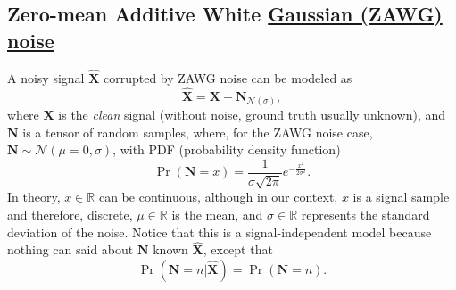 \documentclass{article}
\begin{document}

\subsection{Zero-mean Additive White \href{https://en.wikipedia.org/wiki/Gaussian_noise}{Gaussian (ZAWG) noise}}

A noisy signal $\hat{\mathbf X}$ corrupted by ZAWG noise can be modeled as
\begin{equation}
  \hat{\mathbf X} = {\mathbf X} + {\mathbf N}_{{\mathcal N}(\sigma)},
  \label{eq:AWG_noise_model}  
\end{equation}
where $\mathbf{X}$ is the \emph{clean} signal (without noise, ground
truth usually unknown),
and ${\mathbf N}$ is a tensor of random samples,
where, for the ZAWG noise case,
${\mathbf N}\sim{\mathcal N}(\mu=0,\sigma)$, with PDF (probability density
function)
\begin{equation}
  \Pr({\mathbf N}{=}x) = \frac 1 {\sigma\sqrt{2\pi}} e^{-\frac{x^2}{2\sigma^2} }.
\end{equation}
In theory, $x\in\mathbb{R}$ can be continuous, although in our
context, $x$ is a signal sample and therefore, discrete,
$\mu\in\mathbb{R}$ is the mean, and $\sigma\in\mathbb{R}$ represents
the standard deviation of the noise. Notice that this is a
signal-independent model because nothing can said about ${\mathbf N}$
known $\hat{\mathbf X}$, except that
\begin{equation}
  \Pr(\mathbf{N}{=}n|\hat{\mathbf{X}}) = \Pr(\mathbf{N}{=}n).
\end{equation}
\end{document}
